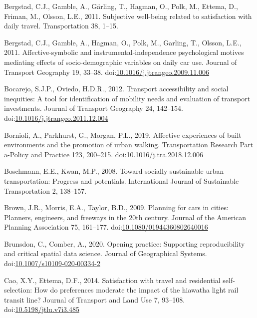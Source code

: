 \documentclass[]{elsarticle} %
\begin{document}
\leavevmode\hypertarget{ref-Bergstad2011subjective}{}%
Bergstad, C.J., Gamble, A., Gärling, T., Hagman, O., Polk, M., Ettema,
D., Friman, M., Olsson, L.E., 2011. Subjective well-being related to
satisfaction with daily travel. Transportation 38, 1--15.

\leavevmode\hypertarget{ref-Bergstad2011affective}{}%
Bergstad, C.J., Gamble, A., Hagman, O., Polk, M., Garling, T., Olsson,
L.E., 2011. Affective-symbolic and instrumental-independence
psychological motives mediating effects of socio-demographic variables
on daily car use. Journal of Transport Geography 19, 33--38.
doi:\href{https://doi.org/10.1016/j.jtrangeo.2009.11.006}{10.1016/j.jtrangeo.2009.11.006}

\leavevmode\hypertarget{ref-Bocarejo2012transport}{}%
Bocarejo, S.J.P., Oviedo, H.D.R., 2012. Transport accessibility and
social inequities: A tool for identification of mobility needs and
evaluation of transport investments. Journal of Transport Geography 24,
142--154.
doi:\href{https://doi.org/10.1016/j.jtrangeo.2011.12.004}{10.1016/j.jtrangeo.2011.12.004}

\leavevmode\hypertarget{ref-Bornioli2019affective}{}%
Bornioli, A., Parkhurst, G., Morgan, P.L., 2019. Affective experiences
of built environments and the promotion of urban walking. Transportation
Research Part a-Policy and Practice 123, 200--215.
doi:\href{https://doi.org/10.1016/j.tra.2018.12.006}{10.1016/j.tra.2018.12.006}

\leavevmode\hypertarget{ref-Boschman2008toward}{}%
Boschmann, E.E., Kwan, M.P., 2008. Toward socially sustainable urban
transportation: Progress and potentials. International Journal of
Sustainable Transportation 2, 138--157.

\leavevmode\hypertarget{ref-Brown2009planning}{}%
Brown, J.R., Morris, E.A., Taylor, B.D., 2009. Planning for cars in
cities: Planners, engineers, and freeways in the 20th century. Journal
of the American Planning Association 75, 161--177.
doi:\href{https://doi.org/10.1080/01944360802640016}{10.1080/01944360802640016}

\leavevmode\hypertarget{ref-Brunsdon2020opening}{}%
Brunsdon, C., Comber, A., 2020. Opening practice: Supporting
reproducibility and critical spatial data science. Journal of
Geographical Systems.
doi:\href{https://doi.org/10.1007/s10109-020-00334-2}{10.1007/s10109-020-00334-2}

\leavevmode\hypertarget{ref-Cao2014satisfaction}{}%
Cao, X.Y., Ettema, D.F., 2014. Satisfaction with travel and residential
self-selection: How do preferences moderate the impact of the hiawatha
light rail transit line? Journal of Transport and Land Use 7, 93--108.
doi:\href{https://doi.org/10.5198/jtlu.v7i3.485}{10.5198/jtlu.v7i3.485}
\end{document}
